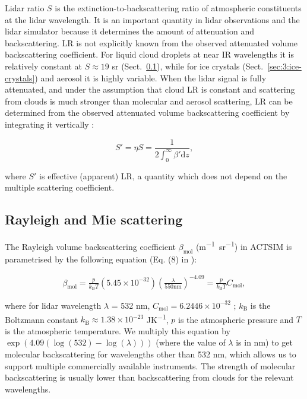 Lidar ratio $S$ is the extinction-to-backscattering ratio of atmospheric
constituents at the lidar wavelength. It is an important quantity in lidar
observations and the lidar simulator because it determines the amount of
attenuation and backscattering. LR is not explicitly known from the observed
attenuated volume backscattering coefficient. For liquid cloud droplets at
near IR wavelengths it is relatively constant at $S \approx 19$ \unit{sr}
(Sect.~\ref{sec:3:rayleigh-and-mie-scattering}), while for ice crystals
(Sect.~\ref{sec:3:ice-crystals}) and aerosol it is highly variable.
When the lidar signal is fully attenuated, and under the assumption
that cloud LR is constant and scattering from clouds is much stronger
than molecular and aerosol scattering, LR can be determined from the
observed attenuated volume backscattering coefficient by integrating it
vertically \citep{oconnor2004}:

\begin{equation}
S' = \eta S = \frac{1}{2\int_0^\infty{\beta'\mathrm{d}z}} ,
\end{equation}

\noindent
where $S'$ is effective (apparent) LR, a quantity which
does not depend on the multiple scattering coefficient.

\subsection{Rayleigh and Mie scattering}
\label{sec:3:rayleigh-and-mie-scattering}

The Rayleigh volume backscattering coefficient $\beta_\text{mol}$ (\unit{m^{-1}sr^{-1}}) in ACTSIM is parametrised by the following equation
(Eq. (8) in \cite{chiriaco2006}):

\begin{align}
\beta_\text{mol} = \frac{p}{k_\mathrm{B}T}(5.45\times 10^{-32})\left(\frac{\lambda}{550 \mathrm{nm}}\right)^{-4.09}
= \frac{p}{k_\mathrm{B}T}C_\text{mol} ,
\end{align}

\noindent where for lidar wavelength $\lambda$ = 532 nm, $C_\text{mol} = 6.2446\times 10^{-32}$
; $k_\mathrm{B}$ is the Boltzmann constant $k_\mathrm{B} \approx 1.38\times 10^{-23}$ \unit{JK^{-1}},
$p$ is the atmospheric pressure and $T$ is the atmospheric temperature.
We multiply this equation by $\exp(4.09(\log(532) - \log(\lambda)))$ (where the value of $\lambda$ is in nm)
to get molecular backscattering for wavelengths other than 532 nm, which allows us to support multiple commercially available instruments.
The strength of molecular backscattering is usually lower than
backscattering from clouds for the relevant wavelengths.

